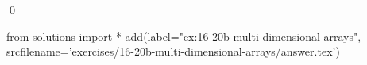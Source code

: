 
\begin{ex} 
  \label{ex:16-20b-multi-dimensional-arrays}
  
  \qed
\end{ex} 
\begin{python0}
from solutions import *
add(label="ex:16-20b-multi-dimensional-arrays",
    srcfilename='exercises/16-20b-multi-dimensional-arrays/answer.tex') 
\end{python0}
